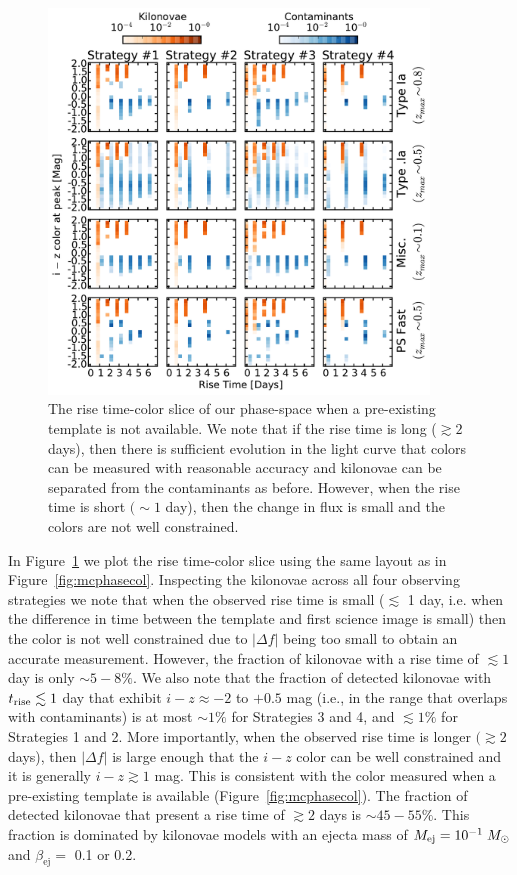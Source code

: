 \begin{figure}[t!]
\centering
\includegraphics[width=0.9\textwidth]{./figs/chapter2/ch2_f14.pdf}
\caption{The rise time-color slice of our phase-space when a pre-existing template is not available. We note that if the rise time is long ($\gtrsim2$ days), then there is sufficient evolution in the light curve that colors can be measured with reasonable accuracy and kilonovae can be separated from the contaminants as before. However, when the rise time is short $(\sim 1$ day), then the change in flux is small and the colors are not well constrained.}
\label{fig:phaserisediff}
\end{figure}
    
In Figure~\ref{fig:phaserisediff} we plot the rise time-color slice using the same layout as in Figure~\ref{fig:mcphasecol}. Inspecting the kilonovae across all four observing strategies we note that when the observed rise time is small ($\lesssim$ 1 day, i.e. when the difference in time between the template and first science image is small) then the color is not well constrained due to $|\Delta f|$ being too small to obtain an accurate measurement. However, the fraction of kilonovae with a rise time of $\lesssim1$ day is only $\sim5-8\%$. We also note that the fraction of detected kilonovae with $t_{{\rm rise}} \lesssim 1$ day that exhibit $i-z\approx -2$ to $+0.5$ mag (i.e., in the range that overlaps with contaminants) is at most $\sim1\%$ for Strategies 3 and 4, and $\lesssim1\%$ for Strategies 1 and 2. More importantly, when the observed rise time is longer $(\gtrsim 2$ days), then $|\Delta f|$ is large enough that the $i-z$ color can be well constrained and it is generally $i-z\gtrsim1$ mag. This is consistent with the color measured when a pre-existing template is available (Figure~\ref{fig:mcphasecol}). The fraction of detected kilonovae that present a rise time of $\gtrsim 2$ days is $\sim45-55\%$. This fraction is dominated by kilonovae models with an ejecta mass of $M_{\rm ej} = 10^{-1} \;M_{\odot}$ and $\beta_{\text{ej}} = $ 0.1 or 0.2.

